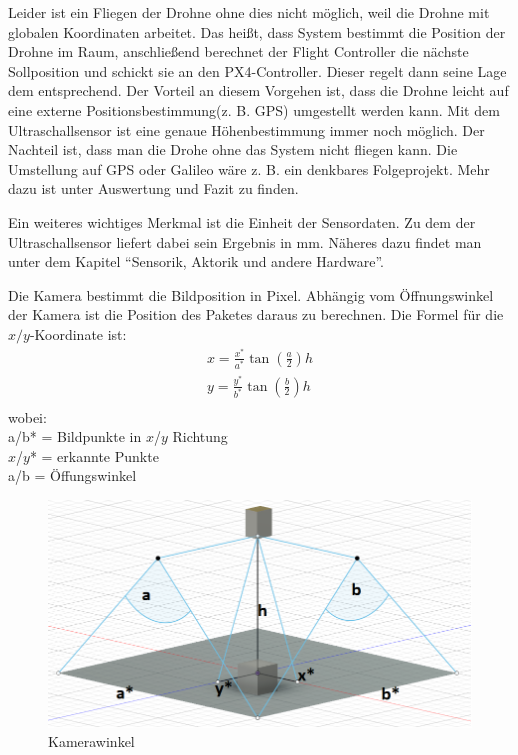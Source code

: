 Leider ist ein Fliegen der Drohne ohne dies nicht möglich, weil die Drohne mit globalen Koordinaten arbeitet. Das heißt, dass System bestimmt die Position der Drohne im Raum, anschließend berechnet der Flight Controller die nächste Sollposition und schickt sie an den PX4-Controller. Dieser regelt dann seine Lage dem entsprechend. Der Vorteil an diesem Vorgehen ist, dass die Drohne leicht auf eine externe Positionsbestimmung(z. B. GPS) umgestellt werden kann. 
Mit dem Ultraschallsensor ist eine genaue Höhenbestimmung immer noch möglich. Der Nachteil ist, dass man die Drohe ohne das System nicht fliegen kann. Die Umstellung auf GPS oder Galileo wäre z. B. ein denkbares Folgeprojekt. Mehr dazu ist unter Auswertung und Fazit zu finden.

Ein weiteres wichtiges Merkmal ist die Einheit der Sensordaten. Zu dem der Ultraschallsensor liefert dabei sein Ergebnis in mm. Näheres dazu findet man unter dem Kapitel ``Sensorik, Aktorik und andere Hardware''.

Die Kamera bestimmt die Bildposition in Pixel. Abhängig vom Öffnungswinkel der Kamera ist die Position des Paketes daraus zu berechnen.
Die Formel für die $x/y$-Koordinate ist:
\begin{equation}
\begin{split}
x = \frac{x^*}{a^*} \tan(\frac{a}{2}) h\\
y = \frac{y^*}{b^*} \tan(\frac{b}{2}) h\\
\end{split}
\end{equation}
wobei:\\
a/b* = Bildpunkte in  $x$/$y$ Richtung\\
$x$/$y$* = erkannte Punkte\\
a/b = Öffungswinkel\\

\begin{figure}[h]
	\centering
	\includegraphics[scale=0.3]{"Grafiken/Kameraformel.png"}
	\caption{Kamerawinkel}
	\label{fig:kameraformel}
\end{figure}
